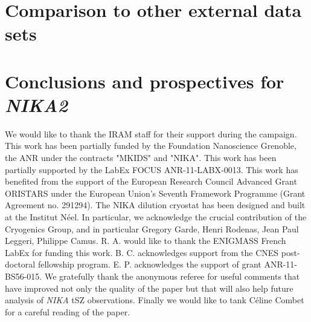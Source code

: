 \documentclass[twocolumn,structabstract]{aa}
\begin{document}
\section{Comparison to other external data sets}
\label{sec:comparison}

\section{Conclusions and prospectives for {\itshape \bfseries NIKA2}}
\label{sec:conclusion}

\begin{acknowledgements}
We would like to thank the IRAM staff for their support during the campaign. 
This work has been partially funded by the Foundation Nanoscience Grenoble, the ANR under the contracts "MKIDS" and "NIKA". 
This work has been partially supported by the LabEx FOCUS ANR-11-LABX-0013. 
This work has benefited from the support of the European Research Council Advanced Grant ORISTARS under the European Union's Seventh Framework Programme (Grant Agreement no. 291294).
The NIKA dilution cryostat has been designed and built at the Institut N\'eel. In particular, we acknowledge the crucial contribution of the Cryogenics Group, and in particular Gregory Garde, Henri Rodenas, Jean Paul Leggeri, Philippe Camus. 
R. A. would like to thank the ENIGMASS French LabEx for funding this work. 
B. C. acknowledges support from the CNES post-doctoral fellowship program. 
E. P. acknowledges the support of grant ANR-11-BS56-015. 
We gratefully thank the anonymous referee for useful comments that have improved not only the quality of the paper but that will also help future analysis of {\it NIKA} tSZ observations. 
Finally we would like to tank C\'eline Combet for a careful reading of the paper.
\end{acknowledgements}

\end{document}
